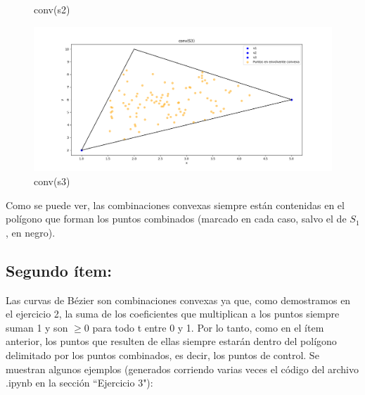 \documentclass{article}
\begin{document}
\begin{figure}[H]
\begin{minipage}{0.45\textwidth}
        \caption{conv(s2)}
        \label{fig:grafico2}
    \end{minipage}
\begin{minipage}{0.45\textwidth}
        \centering
        \includegraphics[width=\textwidth]{imagenes/conv(s3).png}
        \caption{conv(s3)}
        \label{fig:grafico3}
    \end{minipage}
    \label{fig:tres_graficos}
\end{figure}

Como se puede ver, las combinaciones convexas siempre están contenidas en el polígono que forman los puntos combinados (marcado en cada caso, salvo el de $S_1$, en negro).

\subsection*{Segundo ítem:}
Las curvas de Bézier son combinaciones convexas ya que, como demostramos en el ejercicio 2, la suma de los coeficientes que multiplican a los puntos siempre suman 1 y son $\geq 0$ para todo t entre 0 y 1. Por lo tanto, como en el ítem anterior, los puntos que resulten de ellas siempre estarán dentro del polígono delimitado por los puntos combinados, es decir, los puntos de control. Se muestran algunos ejemplos (generados corriendo varias veces el código del archivo .ipynb en la sección ``Ejercicio 3"):
\end{document}
